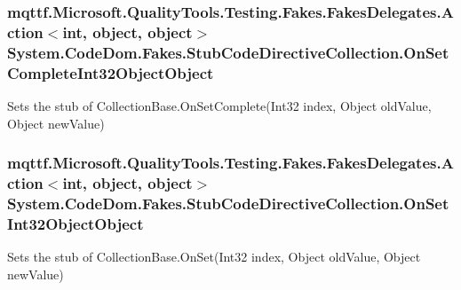 \hypertarget{class_system_1_1_code_dom_1_1_fakes_1_1_stub_code_directive_collection_a06c409fffd69fdea3b5874e224374bea}{
\subsubsection[{On\-Set\-Complete\-Int32\-Object\-Object}]{\setlength{\rightskip}{0pt plus 5cm}mqttf.\-Microsoft.\-Quality\-Tools.\-Testing.\-Fakes.\-Fakes\-Delegates.\-Action$<$int, object, object$>$ System.\-Code\-Dom.\-Fakes.\-Stub\-Code\-Directive\-Collection.\-On\-Set\-Complete\-Int32\-Object\-Object}}\label{class_system_1_1_code_dom_1_1_fakes_1_1_stub_code_directive_collection_a06c409fffd69fdea3b5874e224374bea}


Sets the stub of Collection\-Base.\-On\-Set\-Complete(\-Int32 index, Object old\-Value, Object new\-Value)

\hypertarget{class_system_1_1_code_dom_1_1_fakes_1_1_stub_code_directive_collection_ae246c640ae42ade35e1ee93eefb87586}{
\subsubsection[{On\-Set\-Int32\-Object\-Object}]{\setlength{\rightskip}{0pt plus 5cm}mqttf.\-Microsoft.\-Quality\-Tools.\-Testing.\-Fakes.\-Fakes\-Delegates.\-Action$<$int, object, object$>$ System.\-Code\-Dom.\-Fakes.\-Stub\-Code\-Directive\-Collection.\-On\-Set\-Int32\-Object\-Object}}\label{class_system_1_1_code_dom_1_1_fakes_1_1_stub_code_directive_collection_ae246c640ae42ade35e1ee93eefb87586}


Sets the stub of Collection\-Base.\-On\-Set(\-Int32 index, Object old\-Value, Object new\-Value)

